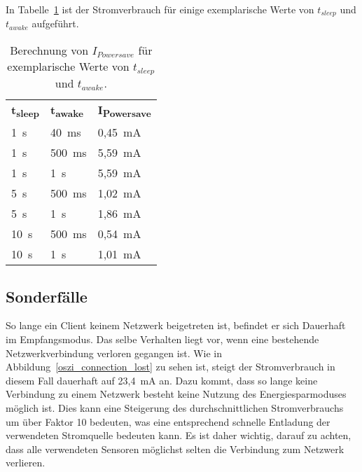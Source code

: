 In Tabelle~\ref{werte_Ipowersave} ist der Stromverbrauch für einige exemplarische Werte von $t_{sleep}$ und $t_{awake}$ 
aufgeführt.

\begin{table}
    \begin{center}
        \begin{tabular}{lll}
            \textbf{t\textsubscript{sleep}} & \textbf{t\textsubscript{awake}} & \textbf{I\textsubscript{Powersave}} \\
            1~s  & 40~ms  & 0,45~mA \\
            1~s  & 500~ms & 5,59~mA \\
            1~s  & 1~s    & 5,59~mA \\
            5~s  & 500~ms & 1,02~mA \\
            5~s  & 1~s    & 1,86~mA \\
            10~s & 500~ms & 0,54~mA \\
            10~s & 1~s    & 1,01~mA 
        \end{tabular}
    \end{center}
    \caption{Berechnung von $I_{Powersave}$ für exemplarische Werte von $t_{sleep}$ und $t_{awake}$.}
    \label{werte_Ipowersave}
\end{table}

\subsection{Sonderfälle}\label{leistungsaufnahme_sonderfaelle}

So lange ein Client keinem Netzwerk beigetreten ist, befindet er sich Dauerhaft im Empfangsmodus. Das selbe Verhalten liegt
vor, wenn eine bestehende Netzwerkverbindung verloren gegangen ist. Wie in Abbildung~\ref{oszi_connection_lost} zu sehen
ist, steigt der Stromverbrauch in diesem Fall dauerhaft auf 23,4~mA an. Dazu kommt, dass so lange keine Verbindung zu
einem Netzwerk besteht keine Nutzung des Energiesparmoduses möglich ist. Dies kann eine Steigerung des durchschnittlichen
Stromverbrauchs um über Faktor 10 bedeuten, was eine entsprechend schnelle Entladung der verwendeten Stromquelle bedeuten
kann. Es ist daher wichtig, darauf zu achten, dass alle verwendeten Sensoren möglichst selten die Verbindung zum 
Netzwerk verlieren.


